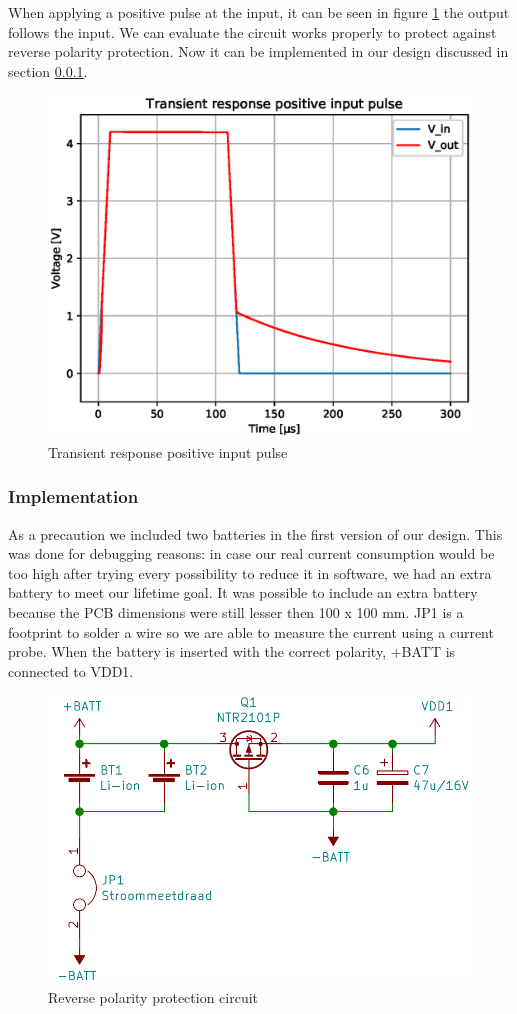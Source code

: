 \documentclass[11pt,a4paper]{article}
\begin{document}
When applying a positive pulse at the input, it can be seen in figure \ref{fig:Transient_response_positive_input_pulse} the output follows the input. We can evaluate the circuit works properly to protect against reverse polarity protection. Now it can be implemented in our design discussed in section \ref{sec:reverse_pol_prot_implementation}.
\begin{figure}[H]
	\centering
	\includegraphics[width=0.8\linewidth]{Transient_response_positive_input_pulse.eps}
	\caption{Transient response positive input pulse}
	\label{fig:Transient_response_positive_input_pulse}
\end{figure}

\subsubsection{Implementation}\label{sec:reverse_pol_prot_implementation}
As a precaution we included two batteries in the first version of our design. This was done for debugging reasons: in case our real current consumption would be too high after trying every possibility to reduce it in software, we had an extra battery to meet our lifetime goal. It was possible to include an extra battery because the PCB dimensions were still lesser then 100 x 100 mm. JP1 is a footprint to solder a wire so we are able to measure the current using a current probe. When the battery is inserted with the correct polarity, +BATT is connected to VDD1.
\begin{figure}[H]
	\centering
	\includegraphics[width=0.8\linewidth]{reverse_polarity_protection.png}
	\caption{Reverse polarity protection circuit}
	\label{fig:reverse_polarity_protection}
\end{figure}
\end{document}
